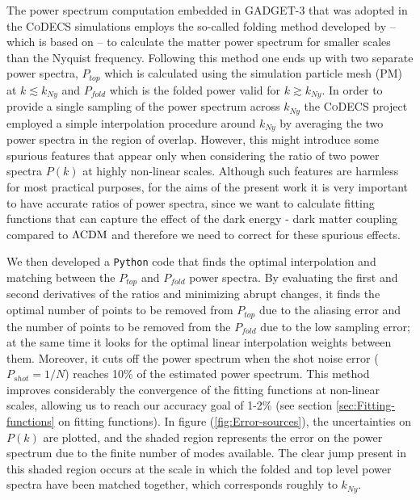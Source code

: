 The power spectrum computation embedded in \textsc{GADGET-3}
that was adopted in the \textsc{CoDECS} simulations
employs the so-called folding method developed by \cite{colombi_accurate_2009}
-- which is based on \cite{jenkins_galaxy_1999} -- to calculate the
matter power spectrum for smaller scales than the Nyquist frequency.
Following this method one ends up with two separate power spectra,
$P_{top}$ which is calculated using the simulation particle mesh
(PM) at $k\lesssim k_{Ny}$ and $P_{fold}$ which is the folded power
valid for $k\gtrsim k_{Ny}$. In order to provide a single sampling
of the power spectrum across $k_{Ny}$ the \textsc{CoDECS} project employed
a simple interpolation procedure around $k_{Ny}$ by averaging the
two power spectra in the region of overlap. However, this might introduce
some spurious features that appear only when considering the ratio
of two power spectra $P(k)$ at highly non-linear scales. Although
such features are harmless for most practical purposes, for the aims
of the present work it is very important to have accurate ratios of
power spectra, since we want to calculate fitting functions that can
capture the effect of the dark energy - dark matter coupling compared
to $\Lambda\mathrm{CDM}$ and therefore we need to correct for these spurious effects.

We then developed a \texttt{Python} code that finds the optimal interpolation
and matching between the $P_{top}$ and $P_{fold}$ power spectra.
By evaluating the first and second derivatives of the ratios and minimizing
abrupt changes, it finds the optimal number of points to be removed
from $P_{top}$ due to the aliasing error and the number of points
to be removed from the $P_{fold}$ due to the low sampling error;
at the same time it looks for the optimal linear interpolation weights
between them. Moreover, it cuts off the power spectrum when the shot
noise error ($P_{shot}=1/N$) reaches 10\% of the estimated power
spectrum. This method improves considerably the convergence of the
fitting functions at non-linear scales, allowing us to reach our accuracy
goal of 1-2\% (see section \ref{sec:Fitting-functions} on fitting
functions). In figure (\ref{fig:Error-sources}), the uncertainties
on $P(k)$ are plotted, and the shaded region represents the error
on the power spectrum due to the finite number of modes available.
The clear jump present in this shaded region occurs at the scale in
which the folded and top level power spectra have been matched together,
which corresponds roughly to $k_{Ny}$.





